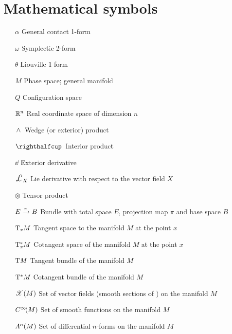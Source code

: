\section*{Mathematical symbols}
\begin{itemize}[itemsep=0pt, leftmargin=2cm, labelsep=0cm, labelwidth=1.9cm, align=left]
    \item[$\alpha$] General contact 1-form
    \item[$\omega$] Symplectic 2-form
    \item[$\theta$] Liouville 1-form
%
    \item[$M$] Phase space; general manifold
    \item[$Q$] Configuration space
%
    \item[$\mathbb{R}^n$] Real coordinate space of dimension $n$
%
%
    \item[$ \,\wedge\, $]  Wedge (or exterior) product
    \item[$\intpr{}{}$]  Interior product
    \item[$\dd{}$]  Exterior derivative
    \item[$\lied{X}{}$]  Lie derivative with respect to the vector field $X$
    \item[$\otimes$]  Tensor product
    \item[$E\xrightarrow[]{\pi}B$]  Bundle with total space $E$, projection map $\pi$ and base space $B$
    \item[$\mathrm{T}_{x}M$]  Tangent space to the manifold $M$ at the point $x$
    \item[$\mathrm{T}_{x}^*M$]  Cotangent space of the manifold $M$ at the point $x$
    \item[$\mathrm{T}M$]  Tangent bundle of the manifold $M$
    \item[$\mathrm{T}^*M$]  Cotangent bundle of the manifold $M$
    \item[$\mathscr{X}\qty(M)$]  Set of vector fields (smooth sections of ) on the manifold $M$
    \item[$C^\infty\!\qty(M)$]  Set of smooth functions on the manifold $M$
    \item[$\Lambda^{n}(M)$]  Set of differential $n$-forms on the manifold $M$
\end{itemize}